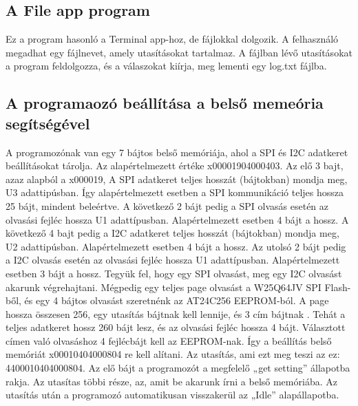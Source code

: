 \documentclass[a4paper,12pt,oneside]{book}
\begin{document}
\subsection{A File app program}
Ez a program hasonló a Terminal app-hoz, de fájlokkal dolgozik. A felhasználó megadhat egy fájlnevet, amely utasításokat tartalmaz. A fájlban lévő utasításokat a program feldolgozza, és a válaszokat kiírja, meg lementi egy log.txt fájlba.
\subsection{A programaozó beállítása a belső memeória segítségével}
A programozónak van egy 7 bájtos belső memóriája, ahol a SPI és I2C adatkeret beállításokat tárolja. Az alapértelmezett értéke x00001904000403. 
Az elő 3 bajt, azaz alapból a x000019, A SPI adatkeret teljes hosszát (bájtokban) mondja meg, U3 adattipúsban. Így alapértelmezett esetben a SPI kommunikáció teljes hossza 25 bájt, mindent beleértve. 
A következő 2 bájt pedig a SPI olvasás esetén az olvasási fejléc hossza U1 adattípusban. Alapértelmezett esetben 4 bájt a hossz. 
A következő 4 bajt pedig a I2C adatkeret teljes hosszát (bájtokban) mondja meg, U2 adattipúsban. Alapértelmezett esetben 4 bájt a hossz.
Az utolsó 2 bájt pedig a I2C olvasás esetén az olvasási fejléc hossza U1 adattípusban. Alapértelmezett esetben 3 bájt a hossz.
Tegyük fel, hogy egy SPI olvasást, meg egy I2C olvasást akarunk végrehajtani. Mégpedig egy teljes page olvasást a W25Q64JV SPI Flash-ből, és egy 4 bájtos olvasást szeretnénk az AT24C256 EEPROM-ból. A page hossza összesen 256, egy utasítás bájtnak kell lennije, és 3 cím bájtnak \cite{FLASH}. Tehát a teljes adatkeret hossz 260 bájt lesz, és az olvasási fejléc hossza 4 bájt\cite{EEPROM}. Választott címen való olvasáshoz 4 fejlécbájt kell az EEPROM-nak. Így a beállítás belső memóriát x00010404000804 re kell alítani.
Az utasítás, ami ezt meg teszi az ez: 4400010404000804.
Az elő bájt a programozót a megfelelő „get setting” állapotba rakja. Az utasítas többi része, az, amit be akarunk írni a belső memóriába. Az utasítás után a programozó automatikusan visszakerül az „Idle” alapállapotba.
\end{document}
